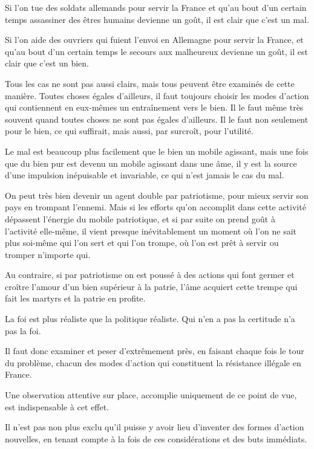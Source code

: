 \documentclass[french,twoside]{book} %
\begin{document}
Si l'on tue des soldats allemands pour servir la France et qu'au bout d'un certain temps assassiner des êtres humains devienne un goût, il est clair que c'est un mal.\par
Si l'on aide des ouvriers qui fuient l'envoi en Allemagne pour servir la France, et qu'au bout d'un certain temps le secours aux malheureux devienne un goût, il est clair que c'est un bien.\par
Tous les cas ne sont pas aussi clairs, mais tous peuvent être examinés de cette manière. Toutes choses égales d'ailleurs, il faut toujours choisir les modes d'action qui contiennent en eux-mêmes un entraînement vers le bien. Il le faut même très souvent quand toutes choses ne sont pas égales d'ailleurs. Il le faut non seulement pour le bien, ce qui suffirait, mais aussi, par surcroît, pour l'utilité.\par
\par
Le mal est beaucoup plus facilement que le bien un mobile agissant, mais une fois que du bien pur est devenu un mobile agissant dans une âme, il y est la source d'une impulsion inépuisable et invariable, ce qui n'est jamais le cas du mal.\par
On peut très bien devenir un agent double par patriotisme, pour mieux servir son pays en trompant l'ennemi. Mais si les efforts qu'on accomplit dans cette activité dépassent l'énergie du mobile patriotique, et si par suite on prend goût à l'activité elle-même, il vient presque inévitablement un moment où l'on ne sait plus soi-même qui l'on sert et qui l'on trompe, où l'on est prêt à servir ou tromper n'importe qui.\par
Au contraire, si par patriotisme on est poussé à des actions qui font germer et croître l'amour d'un bien supérieur à la patrie, l'âme acquiert cette trempe qui fait les martyrs et la patrie en profite.\par
La foi est plus réaliste que la politique réaliste. Qui n'en a pas la certitude n'a pas la foi.\par
Il faut donc examiner et peser d'extrêmement près, en faisant chaque fois le tour du problème, chacun des modes d'action qui constituent la résistance illégale en France.\par
Une observation attentive sur place, accomplie uniquement de ce point de vue, est indispensable à cet effet.\par
Il n'est pas non plus exclu qu'il puisse y avoir lieu d'inventer des formes d'action nouvelles, en tenant compte à la fois de ces considérations et des buts immédiats.\par
\end{document}
